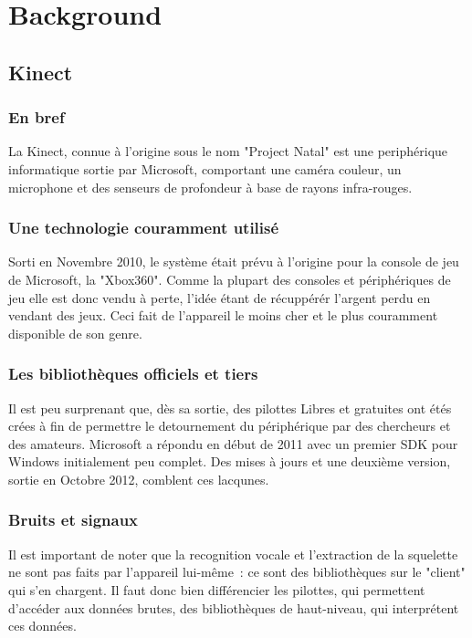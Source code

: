 \documentclass[french,12pt]{report}
\begin{document}

	\chapter{Background}
		\section{Kinect}

			\subsection{En bref}
La Kinect, connue à l'origine sous le nom "Project Natal" est une
periphérique informatique sortie par Microsoft, comportant une caméra
couleur, un microphone et des senseurs de profondeur à base de rayons
infra-rouges.

			\subsection{Une technologie couramment utilisé}
Sorti en Novembre 2010, le système était prévu à l'origine pour la console
de jeu de Microsoft, la "Xbox360". Comme la plupart des consoles et
périphériques de jeu elle
est donc vendu à perte, l'idée étant de récuppérér l'argent perdu en vendant
des jeux. Ceci fait de l'appareil le moins cher et le plus couramment
disponible de son genre.

			\subsection{Les bibliothèques officiels et tiers}
Il est peu surprenant que, dès sa sortie, des pilottes Libres et gratuites
ont étés crées à fin de permettre le detournement du périphérique par des
chercheurs et des amateurs. Microsoft a répondu en début de 2011 avec un
premier SDK pour Windows initialement peu complet. Des mises à jours et une
deuxième version, sortie en Octobre 2012, comblent ces lacqunes.

			\subsection{Bruits et signaux}
Il est important de noter que la recognition vocale et l'extraction de la
squelette ne sont pas faits par l'appareil lui-même~: ce sont des
bibliothèques sur le "client" qui s'en chargent. Il faut donc bien
différencier les pilottes, qui permettent d'accéder aux données brutes, des
bibliothèques de haut-niveau, qui interprétent ces données.
\end{document}
